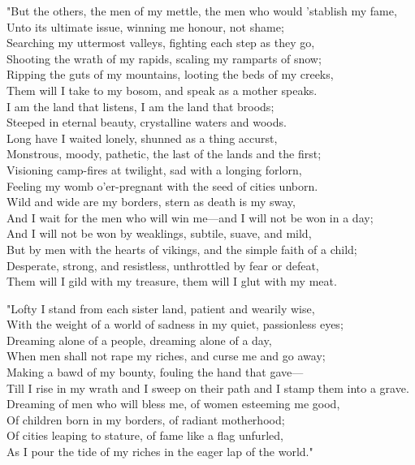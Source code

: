\begin{adjustwidth}{0em}{0em}
\begin{poemblock}
"But the others, the men of my mettle, the men who would 'stablish my fame,\\
Unto its ultimate issue, winning me honour, not shame;\\
Searching my uttermost valleys, fighting each step as they go,\\
Shooting the wrath of my rapids, scaling my ramparts of snow;\\
Ripping the guts of my mountains, looting the beds of my creeks,\\
Them will I take to my bosom, and speak as a mother speaks.\\
I am the land that listens, I am the land that broods;\\
Steeped in eternal beauty, crystalline waters and woods.\\
Long have I waited lonely, shunned as a thing accurst,\\
Monstrous, moody, pathetic, the last of the lands and the first;\\
Visioning camp-fires at twilight, sad with a longing forlorn,\\
Feeling my womb o'er-pregnant with the seed of cities unborn.\\
Wild and wide are my borders, stern as death is my sway,\\
And I wait for the men who will win me—and I will not be won in a day;\\
And I will not be won by weaklings, subtile, suave, and mild,\\
But by men with the hearts of vikings, and the simple faith of a child;\\
Desperate, strong, and resistless, unthrottled by fear or defeat,\\
Them will I gild with my treasure, them will I glut with my meat.

"Lofty I stand from each sister land, patient and wearily wise,\\
With the weight of a world of sadness in my quiet, passionless eyes;\\
Dreaming alone of a people, dreaming alone of a day,\\
When men shall not rape my riches, and curse me and go away;\\
Making a bawd of my bounty, fouling the hand that gave—\\
Till I rise in my wrath and I sweep on their path and I stamp them into a grave.\\
Dreaming of men who will bless me, of women esteeming me good,\\
Of children born in my borders, of radiant motherhood;\\
Of cities leaping to stature, of fame like a flag unfurled,\\
As I pour the tide of my riches in the eager lap of the world."


\end{poemblock}
\end{adjustwidth}
